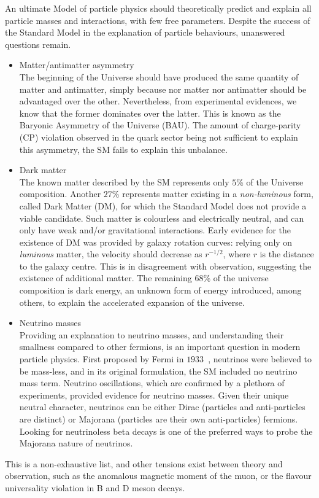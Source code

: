 An ultimate Model of particle physics should theoretically predict and explain all particle masses and interactions, with few free parameters.
Despite the success of the Standard Model in the explanation of particle behaviours, unanswered questions remain.
\begin{itemize}
\item Matter/antimatter asymmetry\\
  The beginning of the Universe should have produced the same quantity of matter and antimatter, simply because nor matter nor antimatter should be advantaged over the other.
  Nevertheless, from experimental evidences, we know that the former dominates over the latter.
  This is known as the Baryonic Asymmetry of the Universe (BAU).
  The amount of charge-parity (CP) violation observed in the quark sector being not sufficient to explain this asymmetry, the SM fails to explain this unbalance.
\item Dark matter\\
  The known matter described by the SM represents only $5$\% of the Universe composition.
  Another $27$\% represents matter existing in a \emph{non-luminous} form, called Dark Matter (DM), for which the Standard Model does not provide a viable candidate.
  Such matter is colourless and electrically neutral, and can only have weak and/or gravitational interactions.
  Early evidence for the existence of DM was provided by galaxy rotation curves: relying only on \emph{luminous} matter, the velocity should decrease as $r^{-1/2}$, where $r$ is the distance to the galaxy centre.
  This is in disagreement with observation, suggesting the existence of additional matter.
  The remaining $68$\% of the universe composition is dark energy, an unknown form of energy introduced, among others, to explain the accelerated expansion of the universe.
\item Neutrino masses\\
  Providing an explanation to neutrino masses, and understanding their smallness compared to other fermions, is an important question in modern particle physics.
  First proposed by Fermi in $1933$~\cite{art:fermi_1933}, neutrinos were believed to be mass-less, and in its original formulation, the SM included no neutrino mass term.
  Neutrino oscillations, which are confirmed by a plethora of experiments, provided evidence for neutrino masses.
  Given their unique neutral character, neutrinos can be either Dirac (particles and anti-particles are distinct) or Majorana (particles are their own anti-particles) fermions.
  Looking for neutrinoless beta decays is one of the preferred ways to probe the Majorana nature of neutrinos.
\end{itemize}
This is a non-exhaustive list, and other tensions exist between theory and observation, such as the anomalous magnetic moment of the muon, or the flavour universality violation in B and D meson decays.


